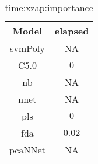 \begin{table}[!ht]
	\centering
	\begin{tabular}{|c|c|}
		\hline
		Model & elapsed \\ \hline
		svmPoly & NA \\ \hline
		C5.0 & $0$ \\ \hline
		nb & NA \\ \hline
		nnet & NA \\ \hline
		pls & $0$ \\ \hline
		fda & $0.02$ \\ \hline
		pcaNNet & NA \\ \hline
	\end{tabular}
	\caption{time:xzap:importance}
	\label{tab:time:xzap:importance}
\end{table}
